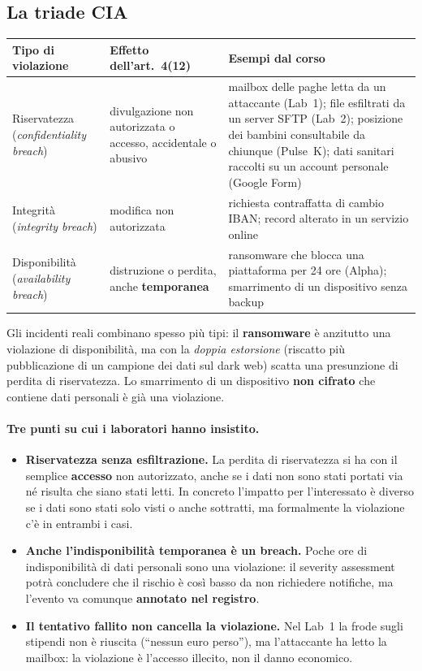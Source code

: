 \subsection{La triade CIA}
\begin{center}
\small
\begin{tabularx}{\linewidth}{>{\raggedright\arraybackslash}p{2.8cm} >{\raggedright\arraybackslash}p{3.6cm} X}
\toprule
\textbf{Tipo di violazione} & \textbf{Effetto dell'art.~4(12)} & \textbf{Esempi dal corso}\\
\midrule
Riservatezza (\emph{confidentiality breach}) & divulgazione non autorizzata o accesso, accidentale o
  abusivo & mailbox delle paghe letta da un attaccante (Lab~1); file esfiltrati da un server SFTP
  (Lab~2); posizione dei bambini consultabile da chiunque (Pulse~K); dati sanitari raccolti su un account
  personale (Google Form)\\
Integrità (\emph{integrity breach}) & modifica non autorizzata & richiesta contraffatta di cambio IBAN;
  record alterato in un servizio online\\
Disponibilità (\emph{availability breach}) & distruzione o perdita, anche \textbf{temporanea} &
  ransomware che blocca una piattaforma per 24 ore (Alpha); smarrimento di un dispositivo senza
  backup\\
\bottomrule
\end{tabularx}
\end{center}
Gli incidenti reali combinano spesso più tipi: il \textbf{ransomware} è anzitutto una violazione di
disponibilità, ma con la \emph{doppia estorsione} (riscatto più pubblicazione di un campione dei dati sul
dark web) scatta una presunzione di perdita di riservatezza. Lo smarrimento di un dispositivo
\textbf{non cifrato} che contiene dati personali è già una violazione.

\paragraph{Tre punti su cui i laboratori hanno insistito.}
\begin{itemize}
  \item \textbf{Riservatezza senza esfiltrazione.} La perdita di riservatezza si ha con il semplice
    \textbf{accesso} non autorizzato, anche se i dati non sono stati portati via né risulta che siano
    stati letti. In concreto l'impatto per l'interessato è diverso se i dati sono stati solo visti o
    anche sottratti, ma formalmente la violazione c'è in entrambi i casi.
  \item \textbf{Anche l'indisponibilità temporanea è un breach.} Poche ore di indisponibilità di dati
    personali sono una violazione: il severity assessment potrà concludere che il rischio è così basso da
    non richiedere notifiche, ma l'evento va comunque \textbf{annotato nel registro}.
  \item \textbf{Il tentativo fallito non cancella la violazione.} Nel Lab~1 la frode sugli stipendi non è
    riuscita (``nessun euro perso''), ma l'attaccante ha letto la mailbox: la violazione è l'accesso
    illecito, non il danno economico.
\end{itemize}

